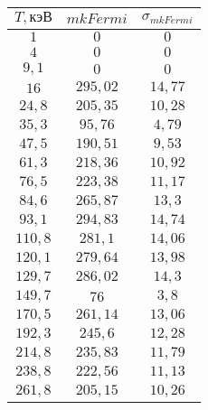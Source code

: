 \begin{tabular}{| c | c | c |}
\hline
$T, кэВ$ & $mkFermi$ & $\sigma_{mkFermi}$\\
    \hline
    $1$ & $0$ & $0$\\
    \hline
    $4$ & $0$ & $0$\\
    \hline
    $9,1$ & $0$ & $0$\\
    \hline
    $16$ & $295,02$ & $14,77$\\
    \hline
    $24,8$ & $205,35$ & $10,28$\\
    \hline
    $35,3$ & $95,76$ & $4,79$\\
    \hline
    $47,5$ & $190,51$ & $9,53$\\
    \hline
    $61,3$ & $218,36$ & $10,92$\\
    \hline
    $76,5$ & $223,38$ & $11,17$\\
    \hline
    $84,6$ & $265,87$ & $13,3$\\
    \hline
    $93,1$ & $294,83$ & $14,74$\\
    \hline
    $110,8$ & $281,1$ & $14,06$\\
    \hline
    $120,1$ & $279,64$ & $13,98$\\
    \hline
    $129,7$ & $286,02$ & $14,3$\\
    \hline
    $149,7$ & $76$ & $3,8$\\
    \hline
    $170,5$ & $261,14$ & $13,06$\\
    \hline
    $192,3$ & $245,6$ & $12,28$\\
    \hline
    $214,8$ & $235,83$ & $11,79$\\
    \hline
    $238,8$ & $222,56$ & $11,13$\\
    \hline
    $261,8$ & $205,15$ & $10,26$\\
    \hline
\end{tabular}
